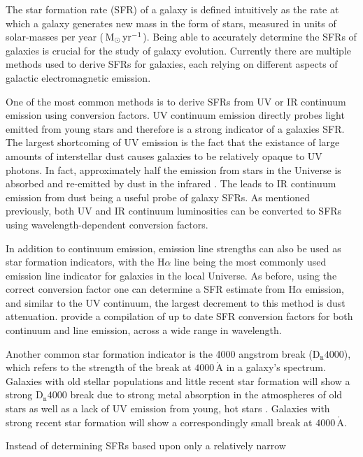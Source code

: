 The star formation rate (SFR) of a galaxy is defined intuitively as the rate
at which a galaxy generates new mass in the form of stars, measured in
units of solar-masses per year ($\,\mathrm{M_{\odot}}\,\mathrm{yr^{-1}}$).  Being
able to accurately determine the SFRs of galaxies is crucial for the
study of galaxy evolution.  Currently there are multiple methods used
to derive SFRs for galaxies, each relying on different aspects of
galactic electromagnetic emission.
\par
One of the most common methods is to derive SFRs from UV or IR
continuum 
emission using conversion factors.  UV continuum emission directly
probes light emitted from young stars and therefore is a strong
indicator of a galaxies SFR.  The largest shortcoming of UV emission
is the fact that the existance of large amounts of interstellar dust
causes galaxies to be relatively opaque to UV photons.  In fact,
approximately half the emission from stars in the Universe is absorbed
and re-emitted by dust in the infrared \citep{kennicutt2012}.
The leads to IR continuum emission from dust being a useful probe of
galaxy SFRs.  As mentioned previously, both UV and IR continuum
luminosities can be converted to SFRs using wavelength-dependent
conversion factors.
\par
In addition to continuum emission, emission line strengths can also be
used as star formation indicators, with the $\mathrm{H}\alpha$ line
being the most commonly used emission line indicator for galaxies in
the local Universe.  As before, using the correct conversion factor
one can determine a SFR estimate from $\mathrm{H}\alpha$ emission, and
similar to the UV continuum, the largest decrement to this method is
dust attenuation.  \citet{kennicutt2012} provide a compilation of up
to date SFR conversion factors for both continuum and line emission,
across a wide range in wavelength.
\par
Another common star formation indicator is the 4000 angstrom break
($\mathrm{D_n}4000$), which refers to the strength of the break at
$4000\,\mathrm{\mathring{A}}$ in a galaxy's spectrum.  Galaxies with
old stellar populations and little recent star formation will show a
strong $\mathrm{D_n}4000$ break due to strong metal absorption in the
atmospheres of old stars as well as a lack of UV emission from young,
hot stars \citep{hamilton1985}.  Galaxies with strong recent star
formation will show a correspondingly small break at
$4000\,\mathrm{\mathring{A}}$.
\par
Instead of determining SFRs based upon only a relatively narrow
